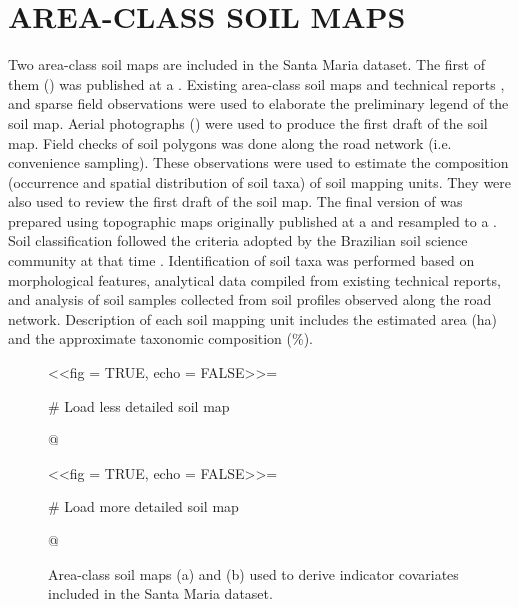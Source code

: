 
\section{AREA-CLASS SOIL MAPS}
\label{sec:covar-data-soil-maps}

Two area-class soil maps are included in the Santa Maria dataset. The first of them (\soilOld{}) was published 
at a  \cite{AzolinEtAl1988}. Existing area-class soil maps and technical reports 
\cite{Brasil1973, Azolin1977, MacielEtAl1987a, MacielEtAl1987, AbraoEtAl1988}, and sparse field observations 
were used to elaborate the preliminary legend of the soil map. Aerial photographs () were used to 
produce the first draft of the soil map. Field checks of soil polygons was done along the road network (i.e. 
convenience sampling). These observations were used to estimate the composition (occurrence and spatial 
distribution of soil taxa) of soil mapping units. They were also used to review the first draft of the soil 
map. The final version of \soilOld{} was prepared using topographic maps originally published at a 
 and resampled to a . Soil classification followed the criteria adopted by the 
Brazilian soil science community at that time \cite{Brasil1973, CamargoEtAl1982, Carvalho1982, LemosEtAl1982, 
OlmosEtAl1982}. Identification of soil taxa was performed based on morphological features, analytical data 
compiled from existing technical reports, and analysis of soil samples collected from soil profiles observed 
along the road network. Description of each soil mapping unit includes the estimated area (\si{\hectare}) and 
the approximate taxonomic composition (\si{\percent}).

\begin{figure}[!ht]
 \centering
 \begin{minipage}[b]{63mm}
  \subcaption{}
  \centering
  <<fig = TRUE, echo = FALSE>>=
   
   # Load less detailed soil map
   
  @
 \end{minipage}
 
 \begin{minipage}[b]{63mm}
  \subcaption{}
  \centering
  <<fig = TRUE, echo = FALSE>>=
   
   # Load more detailed soil map
   
  @
 \end{minipage} 
 \caption{Area-class soil maps (a) \soilOld{} and (b) \soilNew{} used to derive indicator covariates included 
 in the Santa Maria dataset.}
\label{fig:covar-data-soil-maps}
\end{figure}

